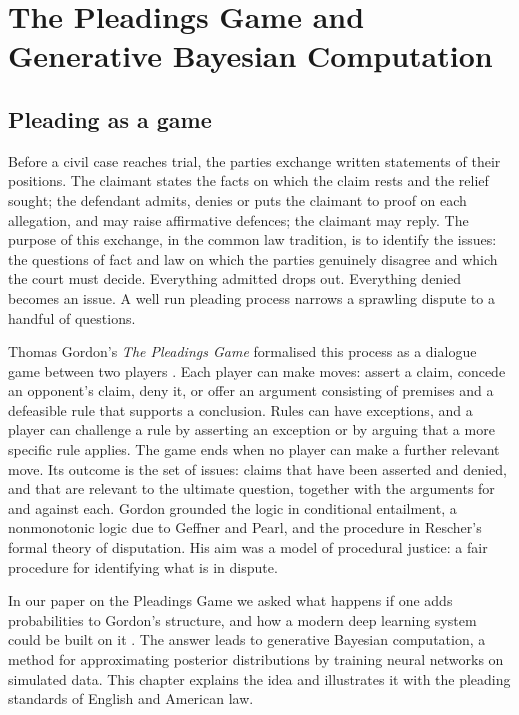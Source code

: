 \chapter{The Pleadings Game and Generative Bayesian Computation}
\label{ch:pleadings}

\section{Pleading as a game}

Before a civil case reaches trial, the parties exchange written statements of their positions. The claimant states the facts on which the claim rests and the relief sought; the defendant admits, denies or puts the claimant to proof on each allegation, and may raise affirmative defences; the claimant may reply. The purpose of this exchange, in the common law tradition, is to identify the issues: the questions of fact and law on which the parties genuinely disagree and which the court must decide. Everything admitted drops out. Everything denied becomes an issue. A well run pleading process narrows a sprawling dispute to a handful of questions.

Thomas Gordon's \emph{The Pleadings Game} formalised this process as a dialogue game between two players \citep{gordon1995}. Each player can make moves: assert a claim, concede an opponent's claim, deny it, or offer an argument consisting of premises and a defeasible rule that supports a conclusion. Rules can have exceptions, and a player can challenge a rule by asserting an exception or by arguing that a more specific rule applies. The game ends when no player can make a further relevant move. Its outcome is the set of issues: claims that have been asserted and denied, and that are relevant to the ultimate question, together with the arguments for and against each. Gordon grounded the logic in conditional entailment, a nonmonotonic logic due to Geffner and Pearl, and the procedure in Rescher's formal theory of disputation. His aim was a model of procedural justice: a fair procedure for identifying what is in dispute.

In our paper on the Pleadings Game we asked what happens if one adds probabilities to Gordon's structure, and how a modern deep learning system could be built on it \citep{polson_sokolov_pleadings}. The answer leads to generative Bayesian computation, a method for approximating posterior distributions by training neural networks on simulated data. This chapter explains the idea and illustrates it with the pleading standards of English and American law.

